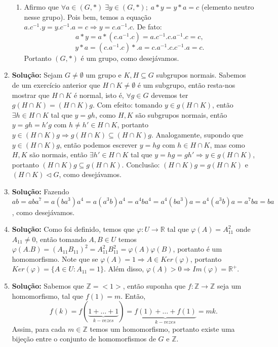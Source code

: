 \documentclass{article}
\begin{document}
\begin{enumerate}
\begin{enumerate}
			\item Afirmo que $\forall a \in (G,*) \; \exists y \in (G,*); \; a*y = y*a = c$ (elemento neutro nesse grupo). Pois bem, temos a equação $a.c^{-1}.y = y.c^{-1}.a = c \Rightarrow y = c.a^{-1}.c$. De fato: 
			$$
			a*y = a*(c.a^{-1}.c) = a.c^{-1}.c.a^{-1}.c = c,
			$$
			$$
			y*a = (c.a^{-1}.c)*.a = c.a^{-1}.c.c^{-1}.a = c.
			$$
			Portanto $(G,*)$ é um grupo, como desejávamos.
		\end{enumerate}
		
		\item \textbf{Solução:} Sejam $G \neq \emptyset$ um grupo e $K,H \subseteq G$ subgrupos normais. Sabemos de um exercício anterior que $H \cap K \neq \emptyset$ é um subgrupo, então resta-nos mostrar que $H \cap K$ é normal, isto é, $\forall g \in G$ devemos ter $g(H \cap K) = (H \cap K)g$. Com efeito: tomando $y \in g(H \cap K)$, então $\exists h \in H \cap K$ tal que $y = gh$, como $H, K$ são subgrupos normais, então $y = gh = h'g$ com $ h \neq h' \in H \cap K$, portanto $y \in ( H \cap K)g \Rightarrow g( H \cap K) \subseteq ( H \cap K)g$. Analogamente, supondo que $y \in ( H \cap K)g$, então podemos escrever $y = hg$ com $h \in H \cap K$, mas como $H,K$ são normais, então $\exists h' \in H \cap K$ tal que $y = hg = gh' \Rightarrow y \in g( H \cap K)$, portanto $( H \cap K)g \subseteq g( H \cap K)$. Conclusão: $( H \cap K)g = g( H \cap K)$ e $( H \cap K) \vartriangleleft G$, como desejávamos.
		
		\item \textbf{Solução:} Fazendo $ab = aba^{7} = a(ba^{3})a^{4} = a(a^{3}b)a^{4} = a^{4}ba^{4} = a^{4}(ba^{3})a = a^{4}(a^{3}b)a = a^{7}ba = ba$, como desejávamos.
		
		\item \textbf{Solução:} Como foi definido, temos que $\varphi: U \to \mathbb{R}$ tal que $\varphi(A) = A_{11}^{2}$ onde $A_{11} \neq 0$, então tomando $A, B \in U$ temos $\varphi(A.B) = (A_{11}B_{11})^{2} = A_{11}^{2}B_{11}^{2} = \varphi(A)\varphi(B)$, portanto é um homomorfismo. Note que se $\varphi(A)=1 \Rightarrow A \in Ker(\varphi)$, portanto $Ker(\varphi) =\{A \in U: A_{11} = 1\}$. Além disso, $\varphi(A)>0 \Rightarrow Im(\varphi) = \mathbb{R^{+}}$.
		
		\item \textbf{Solução:} Sabemos que $\mathbb{Z} = <1>$, então suponha que $f:\mathbb{Z} \to \mathbb{Z}$ seja um homomorfismo, tal que $f(1)=m$. Então,
		$$
		f(k) = f(\underbrace{1+\dots+1}_{k-vezes})=\underbrace{f(1)+\dots+f(1)}_{k-vezes}= mk.
		$$
		Assim, para cada $m \in \mathbb{Z}$ temos um homomorfismo, portanto existe uma bijeção entre o conjunto de homomorfismos de $G$ e $\mathbb{Z}$.
		

\end{enumerate}
\end{document}

